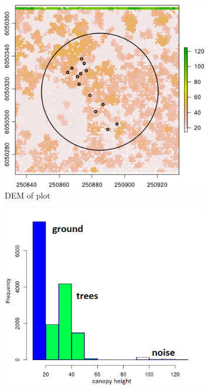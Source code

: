 \documentclass{subfiles}
\begin{document}
 \begin{figure} [h!]			
 	\begin{subfigure}[t]{.49\textwidth}
 		
 		\centering
 		\includegraphics[width=\textwidth]{img/dead/c4_height}
 		\caption{DEM of plot}
 		\label{fig:c4_height}
 	\end{subfigure} \hfill
 	\begin{subfigure}[t]{.49\textwidth}
 		\centering
 		\includegraphics[width=\textwidth]{img/dead/c5_histHeight}

\end{subfigure}
\end{figure}
\end{document}
